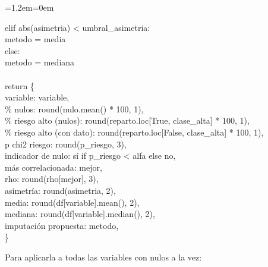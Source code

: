 \documentclass[11pt,a4paper]{article}
\newenvironment{codigo}
  {\par\smallskip\begin{list}{}{\leftmargin=1.2em\rightmargin=0em}\item\relax\ttfamily\scriptsize\raggedright}
  {\end{list}\smallskip}
\begin{document}
{\begin{codigo}
\hspace*{2.08em}elif abs(asimetria) \textless{} umbral\_\allowbreak{}asimetria: \\{}
\hspace*{4.16em}metodo = \textquotedbl{}media\textquotedbl{} \\{}
\hspace*{2.08em}else: \\{}
\hspace*{4.16em}metodo = \textquotedbl{}mediana\textquotedbl{} \\{}
\mbox{} \\{}
\hspace*{2.08em}return \{ \\{}
\hspace*{4.16em}\textquotedbl{}variable\textquotedbl{}: variable, \\{}
\hspace*{4.16em}\textquotedbl{}\% nulos\textquotedbl{}: round(nulo.mean() * 100, 1), \\{}
\hspace*{4.16em}\textquotedbl{}\% riesgo alto (nulos)\textquotedbl{}: round(reparto.loc[True, clase\_\allowbreak{}alta] * 100, 1), \\{}
\hspace*{4.16em}\textquotedbl{}\% riesgo alto (con dato)\textquotedbl{}: round(reparto.loc[False, clase\_\allowbreak{}alta] * 100, 1), \\{}
\hspace*{4.16em}\textquotedbl{}p chi2 riesgo\textquotedbl{}: round(p\_\allowbreak{}riesgo, 3), \\{}
\hspace*{4.16em}\textquotedbl{}indicador de nulo\textquotedbl{}: \textquotedbl{}sí\textquotedbl{} if p\_\allowbreak{}riesgo \textless{} alfa else \textquotedbl{}no\textquotedbl{}, \\{}
\hspace*{4.16em}\textquotedbl{}más correlacionada\textquotedbl{}: mejor, \\{}
\hspace*{4.16em}\textquotedbl{}rho\textquotedbl{}: round(rho[mejor], 3), \\{}
\hspace*{4.16em}\textquotedbl{}asimetría\textquotedbl{}: round(asimetria, 2), \\{}
\hspace*{4.16em}\textquotedbl{}media\textquotedbl{}: round(df[variable].mean(), 2), \\{}
\hspace*{4.16em}\textquotedbl{}mediana\textquotedbl{}: round(df[variable].median(), 2), \\{}
\hspace*{4.16em}\textquotedbl{}imputación propuesta\textquotedbl{}: metodo, \\{}
\hspace*{2.08em}\}
\end{codigo}
Para aplicarla a todas las variables con nulos a la vez:

}
\end{document}
